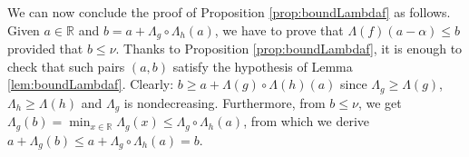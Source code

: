 \documentclass{sig-alternate-2013}
\newcommand{\R}{\mathbb R}
\begin{document}
We can now conclude the proof of Proposition \ref{prop:boundLambdaf} as 
follows. Given $a \in \R$ and $b = a + \Lambda_g \circ \Lambda_h(a)$, we 
have to prove that $\Lambda(f)(a-\alpha) \leq b$ provided that $b \leq 
\nu$. Thanks to Proposition \ref{prop:boundLambdaf}, it is enough to 
check that such pairs $(a,b)$ satisfy the hypothesis of Lemma
\ref{lem:boundLambdaf}. Clearly:
$b \geq a + \Lambda(g) \circ \Lambda(h)(a)$
since $\Lambda_g \geq \Lambda(g)$, $\Lambda_h \geq \Lambda(h)$ and
$\Lambda_g$ is nondecreasing. Furthermore, from $b \leq \nu$, we get
$\Lambda_g(b) = \min_{x \in \R} \Lambda_g(x) \leq \Lambda_g \circ 
\Lambda_h(a)$, from which we derive 
$a + \Lambda_g(b) \leq a + \Lambda_g \circ \Lambda_h(a) = b$.

{\raggedright

%

}
\end{document}
